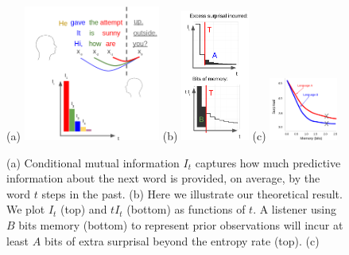 \begin{figure}
	(a)
\includegraphics[width=0.4\textwidth]{figures-gdrive/mi-distance.png}
	(b)
\includegraphics[width=0.2\textwidth]{figures-gdrive/theorem.png}
	(c)
\includegraphics[width=0.2\textwidth]{figures-gdrive/tradeoff.png}
	\caption{
		(a) Conditional mutual information $I_t$ captures how much predictive information about the next word is provided, on average, by the word $t$ steps in the past.
		(b) Here we illustrate our theoretical result. We plot $I_t$ (top) and $tI_t$ (bottom) as functions of $t$. A listener using $B$ bits memory (bottom) to represent prior observations will incur at least $A$ bits of extra surprisal beyond the entropy rate (top). 
		(c)  
}\label{fig:theorem}
\end{figure}


%
%


